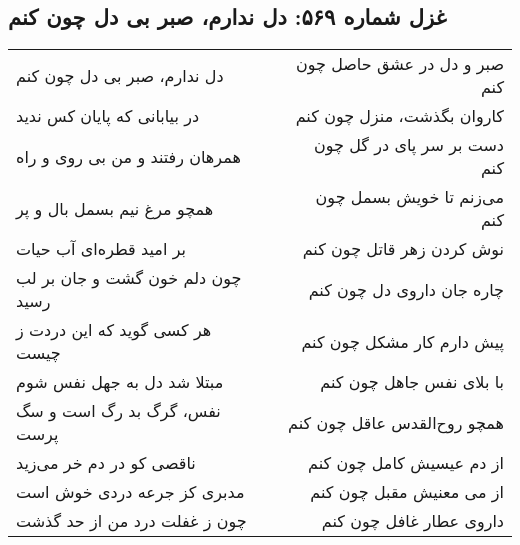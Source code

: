 \begin{center}
\section*{غزل شماره ۵۶۹: دل ندارم، صبر بی دل چون کنم}
\label{sec:569}
\begin{longtable}{l p{0.5cm} r}
دل ندارم، صبر بی دل چون کنم
&&
صبر و دل در عشق حاصل چون کنم
\\
در بیابانی که پایان کس ندید
&&
کاروان بگذشت، منزل چون کنم
\\
همرهان رفتند و من بی روی و راه
&&
دست بر سر پای در گل چون کنم
\\
همچو مرغ نیم بسمل بال و پر
&&
می‌زنم تا خویش بسمل چون کنم
\\
بر امید قطره‌ای آب حیات
&&
نوش کردن زهر قاتل چون کنم
\\
چون دلم خون گشت و جان بر لب رسید
&&
چاره جان داروی دل چون کنم
\\
هر کسی گوید که این دردت ز چیست
&&
پیش دارم کار مشکل چون کنم
\\
مبتلا شد دل به جهل نفس شوم
&&
با بلای نفس جاهل چون کنم
\\
نفس، گرگ بد رگ است و سگ پرست
&&
همچو روح‌القدس عاقل چون کنم
\\
ناقصی کو در دم خر می‌زید
&&
از دم عیسیش کامل چون کنم
\\
مدبری کز جرعه دردی خوش است
&&
از می معنیش مقبل چون کنم
\\
چون ز غفلت درد من از حد گذشت
&&
داروی عطار غافل چون کنم
\\
\end{longtable}
\end{center}
